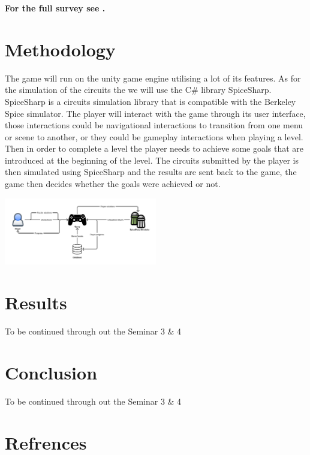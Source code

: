 \documentclass[twoside,a4paper,11pt]{article}
\begin{document}
\begin{multicols}{2}
\textbf{For the full survey see \cite{28}.}

\section{Methodology}

The game will run on the unity game engine utilising a lot of its features. As for the simulation of the circuits the we will use the C\# library SpiceSharp. SpiceSharp is a circuits simulation library that is compatible with the Berkeley Spice simulator. The player will interact with the game through its user interface, those interactions could be navigational interactions to transition from one menu or scene to another, or they could be gameplay interactions when playing a level. Then in order to complete a level the player needs to achieve some goals that are introduced at the beginning of the level. The circuits submitted by the player is then simulated using SpiceSharp and the results are sent back to the game, the game then decides whether the goals were achieved or not.

\begin{center}
    \includegraphics[width=0.5\textwidth]{System Design & Architecture.png}
\end{center}
    
\section{Results} 
 \hfill \break
To be continued through out the Seminar 3 \& 4
 \hfill \break
\section{Conclusion}
\hfill \break
To be continued through out the Seminar 3 \& 4
 \hfill \break
\section{Refrences}
\printbibliography
\end{multicols}
\end{document}
